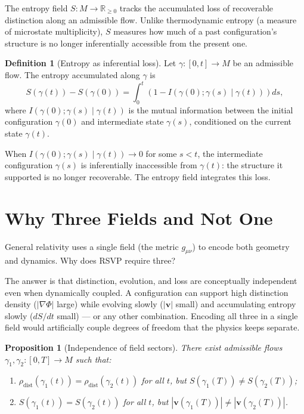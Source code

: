 \documentclass[12pt,a4paper,twoside,openright]{book}
\theoremstyle{plain}
\newtheorem{proposition}[theorem]{Proposition}
\theoremstyle{definition}
\newtheorem{definition}[theorem]{Definition}
\theoremstyle{remark}
\newcommand{\vfield}{\bm{v}}
\newcommand{\Sfield}{S}
\newcommand{\Phifield}{\Phi}
\begin{document}
The entropy field $\Sfield: M \to \mathbb{R}_{\geq 0}$ tracks the accumulated loss of recoverable distinction along an admissible flow. Unlike thermodynamic entropy (a measure of microstate multiplicity), $\Sfield$ measures how much of a past configuration's structure is no longer inferentially accessible from the present one.

\begin{definition}[Entropy as inferential loss]
Let $\gamma: [0,t] \to M$ be an admissible flow. The entropy accumulated along $\gamma$ is
\[
\Sfield(\gamma(t)) - \Sfield(\gamma(0)) = \int_0^t \left(1 - I(\gamma(0); \gamma(s) \mid \gamma(t))\right) ds,
\]
where $I(\gamma(0); \gamma(s) \mid \gamma(t))$ is the mutual information between the initial configuration $\gamma(0)$ and intermediate state $\gamma(s)$, conditioned on the current state $\gamma(t)$.
\end{definition}

When $I(\gamma(0); \gamma(s) \mid \gamma(t)) \to 0$ for some $s < t$, the intermediate configuration $\gamma(s)$ is inferentially inaccessible from $\gamma(t)$: the structure it supported is no longer recoverable. The entropy field integrates this loss.

\section{Why Three Fields and Not One}

General relativity uses a single field (the metric $g_{\mu\nu}$) to encode both geometry and dynamics. Why does RSVP require three?

The answer is that distinction, evolution, and loss are conceptually independent even when dynamically coupled. A configuration can support high distinction density ($|\nabla\Phifield|$ large) while evolving slowly ($|\vfield|$ small) and accumulating entropy slowly ($d\Sfield/dt$ small) --- or any other combination. Encoding all three in a single field would artificially couple degrees of freedom that the physics keeps separate.

\begin{proposition}[Independence of field sectors]
There exist admissible flows $\gamma_1, \gamma_2: [0,T] \to M$ such that:
\begin{enumerate}
\item $\rho_{\mathrm{dist}}(\gamma_1(t)) = \rho_{\mathrm{dist}}(\gamma_2(t))$ for all $t$, but $\Sfield(\gamma_1(T)) \neq \Sfield(\gamma_2(T))$;
\item $\Sfield(\gamma_1(t)) = \Sfield(\gamma_2(t))$ for all $t$, but $|\vfield(\gamma_1(T))| \neq |\vfield(\gamma_2(T))|$.
\end{enumerate}
\end{proposition}
\end{document}
